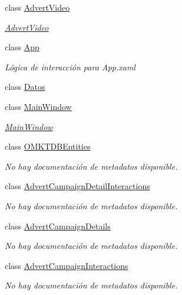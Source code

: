 \begin{DoxyCompactItemize}
\item 
class \hyperlink{class_game_memory_1_1_advert_video}{Advert\-Video}
\begin{DoxyCompactList}\small\item\em \hyperlink{class_game_memory_1_1_advert_video}{Advert\-Video} \end{DoxyCompactList}\item 
class \hyperlink{class_game_memory_1_1_app}{App}
\begin{DoxyCompactList}\small\item\em Lógica de interacción para App.\-xaml \end{DoxyCompactList}\item 
class \hyperlink{class_game_memory_1_1_datos}{Datos}
\item 
class \hyperlink{class_game_memory_1_1_main_window}{Main\-Window}
\begin{DoxyCompactList}\small\item\em \hyperlink{class_game_memory_1_1_main_window}{Main\-Window} \end{DoxyCompactList}\item 
class \hyperlink{class_game_memory_1_1_o_m_k_t_d_b_entities}{O\-M\-K\-T\-D\-B\-Entities}
\begin{DoxyCompactList}\small\item\em No hay documentación de metadatos disponible. \end{DoxyCompactList}\item 
class \hyperlink{class_game_memory_1_1_advert_campaign_detail_interactions}{Advert\-Campaign\-Detail\-Interactions}
\begin{DoxyCompactList}\small\item\em No hay documentación de metadatos disponible. \end{DoxyCompactList}\item 
class \hyperlink{class_game_memory_1_1_advert_campaign_details}{Advert\-Campaign\-Details}
\begin{DoxyCompactList}\small\item\em No hay documentación de metadatos disponible. \end{DoxyCompactList}\item 
class \hyperlink{class_game_memory_1_1_advert_campaign_interactions}{Advert\-Campaign\-Interactions}
\begin{DoxyCompactList}\small\item\em No hay documentación de metadatos disponible. \end{DoxyCompactList}\item 

\end{DoxyCompactItemize}
